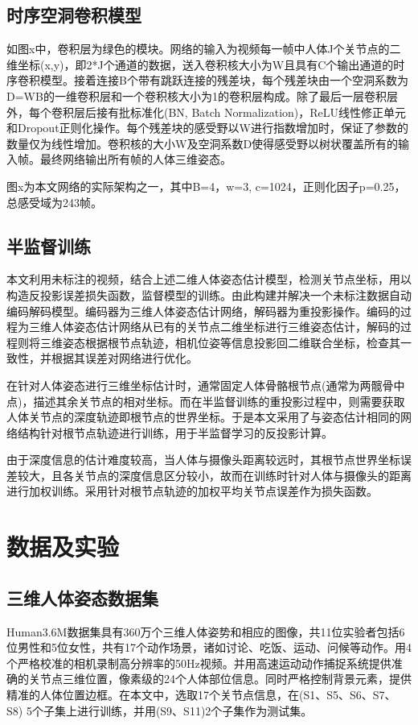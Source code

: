 \subsection{时序空洞卷积模型}{}
如图x中，卷积层为绿色的模块。网络的输入为视频每一帧中人体J个关节点的二维坐标(x,y)，即2*J个通道的数据，送入卷积核大小为W且具有C个输出通道的时序卷积模型。接着连接B个带有跳跃连接的残差块，每个残差块由一个空洞系数为D=WB的一维卷积层和一个卷积核大小为1的卷积层构成。除了最后一层卷积层外，每个卷积层后接有批标准化(BN, Batch Normalization)，ReLU线性修正单元和Dropout正则化操作。每个残差块的感受野以W进行指数增加时，保证了参数的数量仅为线性增加。卷积核的大小W及空洞系数D使得感受野以树状覆盖所有的输入帧。最终网络输出所有帧的人体三维姿态。

图x为本文网络的实际架构之一，其中B=4，w=3, c=1024，正则化因子p=0.25，总感受域为243帧。

\subsection{半监督训练}{}
本文利用未标注的视频，结合上述二维人体姿态估计模型，检测关节点坐标，用以构造反投影误差损失函数，监督模型的训练。由此构建并解决一个未标注数据自动编码解码模型。编码器为三维人体姿态估计网络，解码器为重投影操作。编码的过程为三维人体姿态估计网络从已有的关节点二维坐标进行三维姿态估计，解码的过程则将三维姿态根据根节点轨迹，相机位姿等信息投影回二维联合坐标，检查其一致性，并根据其误差对网络进行优化。

在针对人体姿态进行三维坐标估计时，通常固定人体骨骼根节点(通常为两髋骨中点)，描述其余关节点的相对坐标。而在半监督训练的重投影过程中，则需要获取人体关节点的深度轨迹即根节点的世界坐标。于是本文采用了与姿态估计相同的网络结构针对根节点轨迹进行训练，用于半监督学习的反投影计算。

由于深度信息的估计难度较高，当人体与摄像头距离较远时，其根节点世界坐标误差较大，且各关节点的深度信息区分较小，故而在训练时针对人体与摄像头的距离进行加权训练。采用针对根节点轨迹的加权平均关节点误差作为损失函数。


\section{数据及实验}
\subsection{三维人体姿态数据集}{}
Human3.6M数据集具有360万个三维人体姿势和相应的图像，共11位实验者包括6位男性和5位女性，共有17个动作场景，诸如讨论、吃饭、运动、问候等动作。用4个严格校准的相机录制高分辨率的50Hz视频。并用高速运动动作捕捉系统提供准确的关节点三维位置，像素级的24个人体部位信息。同时严格控制背景元素，提供精准的人体位置边框。在本文中，选取17个关节点信息，在(S1、S5、S6、S7、S8) 5个子集上进行训练，并用(S9、S11)2个子集作为测试集。

